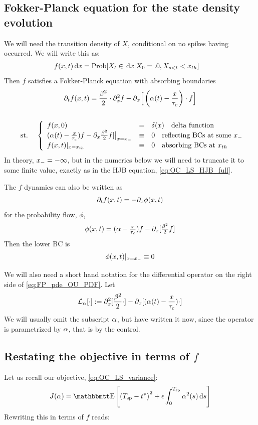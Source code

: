 \documentclass{article}
\begin{document}
\subsection{Fokker-Planck equation for the state density evolution} 
We will need the transition density of $X$, conditional on no
spikes having occurred. We will write this as:
\begin{align*}
f(x,t) \, \mathrm{d} x &= \operatorname{Prob}[X_t\in \, \mathrm{d} x | X_0 = .0, X_{s<t} < { x_{th} }]  								  
\end{align*}
Then $f$ satisfies a Fokker-Planck equation with absorbing boundaries
\begin{equation}
\begin{gathered}
{\partial}_t f(x,t) =
				\frac{{\beta}^2 }{2}\cdot {\partial}^2_x f -  
				{\partial}_x \Big[ \left({\alpha}(t)- \frac{x}{{ \tau_{c} }}\right)  \cdot f \Big]
\\
\\
\begin{array}{lll}
	&\textrm{st.\ }& 
	\left\{ \begin{array}{lcl}
	 f(x,0) &=& \delta(x) \quad \textrm{delta function}
	\\
	({\alpha}(t)- \tfrac x {{ \tau_{c} }})f - {\partial}_x \tfrac {{\beta}^2}2 f] \big|_{x={ x_{-} }} &\equiv& 0
	\quad \textrm{reflecting BCs at some } { x_{-} } 
	\\
	f(x,t) |_{x={ x_{th} }} &\equiv& 0 \quad \textrm{absorbing BCs at } { x_{th} }
\end{array} \right. 
\end{array}
\label{eq:FP_pde_OU_PDF}
\end{gathered}
\end{equation}
In theory, ${ x_{-} } = -\infty$, but in the numerics below we will need to
truncate it to some finite value, exactly as in the HJB equation,
\cref{eq:OC_LS_HJB_full}.

The $f$ dynamics can also be written as
$$
{\partial}_t f(x,t) = - {\partial}_x \phi(x,t)
$$
for the probability flow, $\phi$, 
$$
\phi(x,t) = ({\alpha}- \tfrac x {{ \tau_{c} }})f - {\partial}_x [\tfrac {{\beta}^2}2 f]
$$
Then the lower BC is
$$
\phi(x,t) |_{x={ x_{-} }} \equiv 0
$$

We will also need a short hand notation for the differential operator on the
right side of \cref{eq:FP_pde_OU_PDF}. Let $$ { \mathcal{L} }_{\alpha}[\cdot] := {\partial}^2_x [
\frac{{\beta}^2 }{2} \cdot] - {\partial}_x  [ ({\alpha}(t)- \frac{x}{{ \tau_{c} }}) \cdot] $$ We will
usually omit the subscript ${\alpha}$, but have written it now, since the operator is
parametrized by ${\alpha}$, that is by the control.


\subsection{Restating the objective in terms of $f$}
Let us recall our objective, \cref{eq:OC_LS_variance}:
$$
J(\a) = \Exp\left[
(\ts - \T \big)^2 
+  
\e \int_0^\ts  \a^2(s) \intd{s}
\right]
$$
Rewriting this in terms of $f$ reads:
\end{document}
